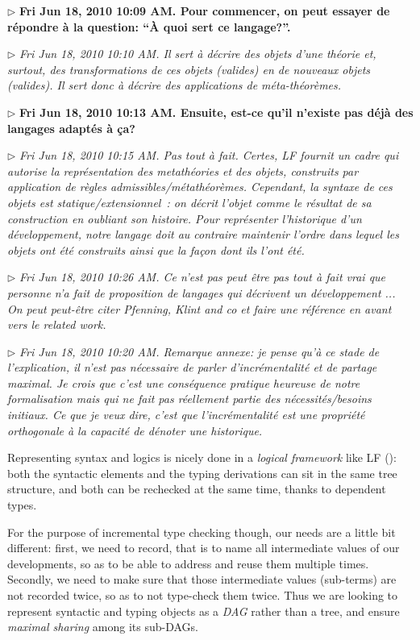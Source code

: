 \documentclass{article}
\newcommand{\remplan}[1]{\noindent\textcolor{bwblue}{$\triangleright$ \textbf{#1}}}
\newcommand{\remtext}[1]{\textcolor{bwgreen}{$\triangleright$ \textsl{#1}}}
\begin{document}
\remplan{Fri Jun 18, 2010 10:09 AM. Pour commencer, on peut essayer 
  de répondre à la question: ``À quoi sert ce langage?''. }

\remtext{Fri Jun 18, 2010 10:10 AM. Il sert à décrire des objets d'une
  théorie et, surtout, des transformations de ces objets (valides) en
  de nouveaux objets (valides). Il sert donc à décrire des applications
  de méta-théorèmes.}

\remplan{Fri Jun 18, 2010 10:13 AM. Ensuite, est-ce qu'il n'existe pas déjà
  des langages adaptés à ça? }

\remtext{Fri Jun 18, 2010 10:15 AM. Pas tout à fait. Certes, LF
  fournit un cadre qui autorise la représentation des metathéories et
  des objets, construits par application de règles
  admissibles/métathéorèmes. Cependant, la syntaxe de ces objets 
  est statique/extensionnel~: on décrit l'objet comme le résultat
  de sa construction en oubliant son histoire. Pour représenter 
  l'historique d'un développement, notre langage
  doit au contraire maintenir l'ordre dans lequel les objets ont
  été construits ainsi que la façon dont ils l'ont été.}

\remtext{Fri Jun 18, 2010 10:26 AM. Ce n'est pas peut être pas tout à fait vrai que personne n'a
  fait de proposition de langages qui décrivent un développement ...
  On peut peut-être citer Pfenning, Klint and co et faire une référence
  en avant vers le related work.}

\remtext{Fri Jun 18, 2010 10:20 AM. Remarque annexe: je pense qu'à ce
  stade de l'explication, il n'est pas nécessaire de parler
  d'incrémentalité et de partage maximal. Je crois que c'est une
  conséquence pratique heureuse de notre formalisation mais qui ne
  fait pas réellement partie des nécessités/besoins initiaux.
  Ce que je veux dire, c'est que l'incrémentalité est une propriété
  orthogonale à la capacité de dénoter une historique.}

Representing syntax and logics is nicely done in a \emph{logical
  framework} like LF (\cite{harper1993framework}): both the syntactic
elements and the typing derivations can sit in the same tree
structure, and both can be rechecked at the same time, thanks to
dependent types.

For the purpose of incremental type checking though, our needs are a
little bit different: first, we need to record, that is to name all
intermediate values of our developments, so as to be able to address
and reuse them multiple times. Secondly, we need to make sure that
those intermediate values (sub-terms) are not recorded twice, so as to
not type-check them twice. Thus we are looking to represent syntactic
and typing objects as a \emph{DAG} rather than a tree, and ensure
\emph{maximal sharing} among its sub-DAGs.
\end{document}
